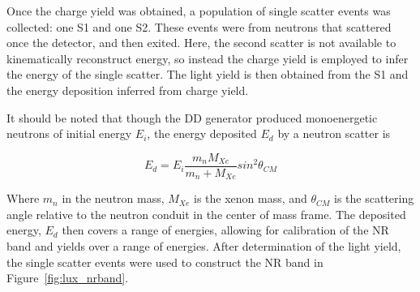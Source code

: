 Once the charge yield was obtained, a population of single scatter events was collected: one S1 and one S2. These events were from neutrons that scattered once the detector, and then exited. Here, the second scatter is not available to kinematically reconstruct energy, so instead the charge yield is employed to infer the energy of the single scatter. The light yield is then obtained from the S1 and the energy deposition inferred from charge yield. 

It should be noted that though the \ac{DD} generator produced monoenergetic neutrons of initial energy $E_{i}$, the energy deposited $E_{d}$ by a neutron scatter is

\begin{equation}
E_{d} = E_{i} \frac{m_{n} M_{Xe}}{m_{n} + M_{Xe}} sin^{2}\theta_{CM}
\end{equation}

Where $m_{n}$ in the neutron mass, $M_{Xe}$ is the xenon mass, and $\theta_{CM}$ is the scattering angle relative to the neutron conduit in the center of mass frame. The deposited energy, $E_{d}$ then covers a range of energies, allowing for calibration of the \ac{NR} band and yields over a range of energies. After determination of the light yield, the single scatter events were used to construct the \ac{NR} band in Figure~\ref{fig:lux_nrband}.

